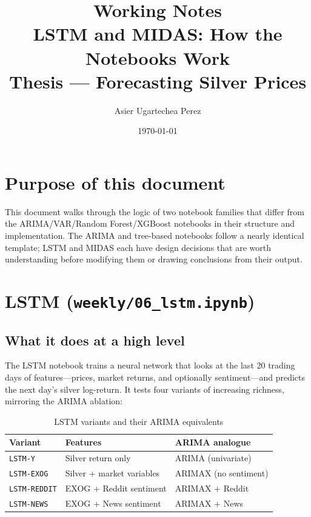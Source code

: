 \documentclass[12pt, a4paper]{article}
\title{
  {\large Working Notes} \\[0.4cm]
  {\LARGE\bfseries LSTM and MIDAS: How the Notebooks Work}\\[0.4cm]
  {\normalsize Thesis — Forecasting Silver Prices}
}
\author{Asier Ugartechea Perez}
\date{\today}
\begin{document}
\maketitle
\tableofcontents
\newpage

\section{Purpose of this document}

This document walks through the logic of two notebook families that differ from the
ARIMA/VAR/Random Forest/XGBoost notebooks in their structure and implementation.
The ARIMA and tree-based notebooks follow a nearly identical template; LSTM and MIDAS
each have design decisions that are worth understanding before modifying them or
drawing conclusions from their output.

\section{LSTM (\texttt{weekly/06\_lstm.ipynb})}

\subsection{What it does at a high level}

The LSTM notebook trains a neural network that looks at the last 20 trading days of
features---prices, market returns, and optionally sentiment---and predicts the next
day's silver log-return. It tests four variants of increasing richness, mirroring the
ARIMA ablation:

\begin{table}[H]
\centering
\caption{LSTM variants and their ARIMA equivalents}
\begin{tabular}{llp{5.5cm}}
\toprule
Variant & Features & ARIMA analogue \\
\midrule
\texttt{LSTM-Y}      & Silver return only       & ARIMA (univariate) \\
\texttt{LSTM-EXOG}   & Silver + market variables & ARIMAX (no sentiment) \\
\texttt{LSTM-REDDIT} & EXOG + Reddit sentiment  & ARIMAX + Reddit \\
\texttt{LSTM-NEWS}   & EXOG + News sentiment    & ARIMAX + News \\
\bottomrule
\end{tabular}
\end{table}
\end{document}
